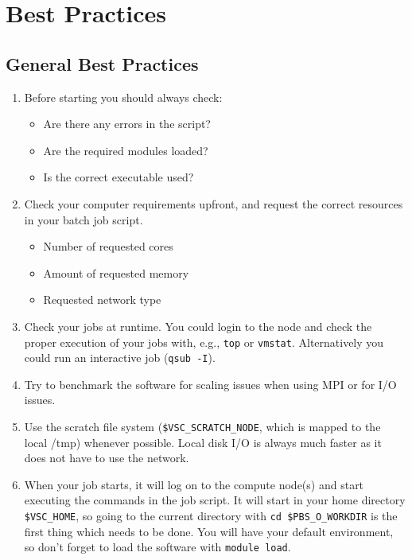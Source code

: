 \chapter{Best Practices}
\label{ch:best-practices}

\section{General Best Practices}
\label{sec:general-best-practices}
\begin{enumerate}

  \item  Before starting you should always check:
  \begin{itemize}
    \item  Are there any errors in the script?
    \item  Are the required modules loaded?
    \item  Is the correct executable used?
\end{itemize}

  \item  Check your computer requirements upfront, and request the correct resources in your batch job script.
  \begin{itemize}
    \item  Number of requested cores
    \item  Amount of requested memory
    \item  Requested network type
\end{itemize}

  \item  Check your jobs at runtime. You could login to the node and check the
    proper execution of your jobs with, e.g., \lstinline|top| or \lstinline|vmstat|.
    Alternatively you could run an interactive job (\lstinline|qsub -I|).

  \item  Try to benchmark the software for scaling issues when using MPI or for
    I/O issues.

  \item  Use the scratch file system (\lstinline|$VSC_SCRATCH_NODE|, which is mapped to the
    local /tmp) whenever possible. Local disk I/O is always much faster as it
    does not have to use the network.

  \item  When your job starts, it will log on to the compute node(s) and start
    executing the commands in the job script. It will start in your home
    directory \lstinline|$VSC_HOME|, so going to the current directory with
    \lstinline|cd $PBS_O_WORKDIR| is the first thing which needs to be done.  You will
    have your default environment, so don't forget to load the software with
    \lstinline|module load|.


\end{enumerate}
